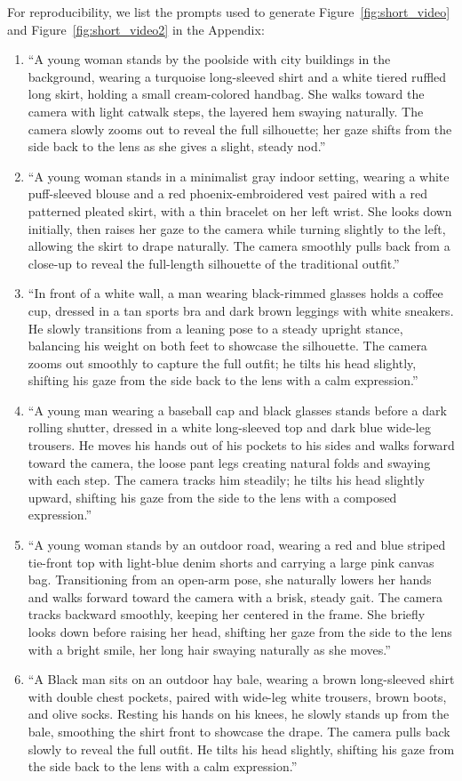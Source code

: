 For reproducibility, we list the prompts used to generate Figure~\ref{fig:short_video} and Figure~\ref{fig:short_video2} in the Appendix:
\begin{enumerate}
\item ``A young woman stands by the poolside with city buildings in the background, wearing a turquoise long-sleeved shirt and a white tiered ruffled long skirt, holding a small cream-colored handbag. She walks toward the camera with light catwalk steps, the layered hem swaying naturally. The camera slowly zooms out to reveal the full silhouette; her gaze shifts from the side back to the lens as she gives a slight, steady nod.''
% 
\item ``A young woman stands in a minimalist gray indoor setting, wearing a white puff-sleeved blouse and a red phoenix-embroidered vest paired with a red patterned pleated skirt, with a thin bracelet on her left wrist. She looks down initially, then raises her gaze to the camera while turning slightly to the left, allowing the skirt to drape naturally. The camera smoothly pulls back from a close-up to reveal the full-length silhouette of the traditional outfit.''
% 
\item ``In front of a white wall, a man wearing black-rimmed glasses holds a coffee cup, dressed in a tan sports bra and dark brown leggings with white sneakers. He slowly transitions from a leaning pose to a steady upright stance, balancing his weight on both feet to showcase the silhouette. The camera zooms out smoothly to capture the full outfit; he tilts his head slightly, shifting his gaze from the side back to the lens with a calm expression.''
% 
\item ``A young man wearing a baseball cap and black glasses stands before a dark rolling shutter, dressed in a white long-sleeved top and dark blue wide-leg trousers. He moves his hands out of his pockets to his sides and walks forward toward the camera, the loose pant legs creating natural folds and swaying with each step. The camera tracks him steadily; he tilts his head slightly upward, shifting his gaze from the side to the lens with a composed expression.''
% 
\item ``A young woman stands by an outdoor road, wearing a red and blue striped tie-front top with light-blue denim shorts and carrying a large pink canvas bag. Transitioning from an open-arm pose, she naturally lowers her hands and walks forward toward the camera with a brisk, steady gait. The camera tracks backward smoothly, keeping her centered in the frame. She briefly looks down before raising her head, shifting her gaze from the side to the lens with a bright smile, her long hair swaying naturally as she moves.''
% 
\item ``A Black man sits on an outdoor hay bale, wearing a brown long-sleeved shirt with double chest pockets, paired with wide-leg white trousers, brown boots, and olive socks. Resting his hands on his knees, he slowly stands up from the bale, smoothing the shirt front to showcase the drape. The camera pulls back slowly to reveal the full outfit. He tilts his head slightly, shifting his gaze from the side back to the lens with a calm expression.''
\end{enumerate}



